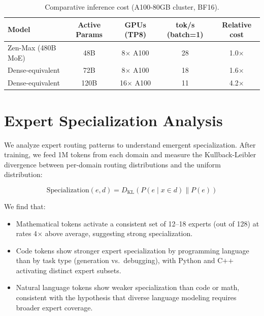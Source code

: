 \documentclass[11pt,a4paper]{article}
\begin{document}
\begin{table}[H]
\centering
\caption{Comparative inference cost (A100-80GB cluster, BF16).}
\label{tab:inference_cost}
\begin{tabular}{lcccc}
\toprule
\textbf{Model} & \textbf{Active Params} & \textbf{GPUs (TP8)} & \textbf{tok/s (batch=1)} & \textbf{Relative cost} \\
\midrule
Zen-Max (480B MoE) & 48B  & 8$\times$ A100 & 28  & 1.0$\times$ \\
Dense-equivalent   & 72B  & 8$\times$ A100 & 18  & 1.6$\times$ \\
Dense-equivalent   & 120B & 16$\times$ A100 & 11  & 4.2$\times$ \\
\bottomrule
\end{tabular}
\end{table}

\section{Expert Specialization Analysis}

We analyze expert routing patterns to understand emergent specialization. After training,
we feed 1M tokens from each domain and measure the Kullback-Leibler divergence between
per-domain routing distributions and the uniform distribution:

\begin{equation}
  \text{Specialization}(e, d) = D_{\text{KL}}(P(e \mid x \in d) \| P(e))
\end{equation}

We find that:

\begin{itemize}
  \item Mathematical tokens activate a consistent set of 12--18 experts (out of 128) at
        rates 4$\times$ above average, suggesting strong specialization.
  \item Code tokens show stronger expert specialization by programming language than by
        task type (generation vs.\ debugging), with Python and C$+$$+$ activating distinct
        expert subsets.
  \item Natural language tokens show weaker specialization than code or math, consistent
        with the hypothesis that diverse language modeling requires broader expert coverage.
\end{itemize}

\end{document}
